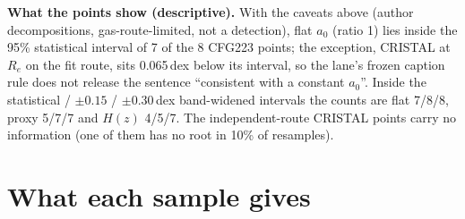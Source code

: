 \documentclass[10pt]{article}
\begin{document}
\textbf{What the points show (descriptive).} With the caveats above (author decompositions, gas-route-limited, not a detection), flat $a_0$ (ratio 1) lies inside the 95\% statistical interval of 7 of the 8 CFG223 points; the exception, CRISTAL at $R_e$ on the fit route, sits 0.065\,dex below its interval, so the lane's frozen caption rule does not release the sentence ``consistent with a constant $a_0$''. Inside the statistical / $\pm0.15$ / $\pm0.30$\,dex band-widened intervals the counts are flat 7/8/8, proxy 5/7/7 and $H(z)$ 4/5/7. The independent-route CRISTAL points carry no information (one of them has no root in 10\% of resamples).

\section{What each sample gives}\label{sec:samples}
\end{document}
